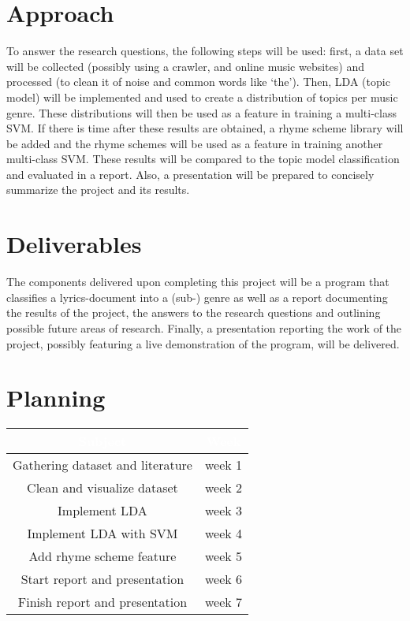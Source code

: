 \documentclass[12pt,a4paper]{amsart}
\begin{document}
\section{Approach}
To answer the research questions, the following steps will be used: first, a data set will be collected (possibly using a crawler, and online music websites) and processed (to clean it of noise and common words like `the'). Then, LDA (topic model) will be implemented and used to create a distribution of topics per music genre. These distributions will then be used as a feature in training a multi-class SVM. If there is time after these results are obtained, a rhyme scheme library will be added and the rhyme schemes will be used as a feature in training another multi-class SVM. These results will be compared to the topic model classification and evaluated in a report. Also, a presentation will be prepared to concisely summarize the project and its results.

\section{Deliverables}
The components delivered upon completing this project will be a program that classifies a lyrics-document into a (sub-) genre as well as a report documenting the results of the project, the answers to the research questions and outlining possible future areas of research. Finally, a  presentation reporting the work of the project, possibly featuring a live demonstration of the program, will be delivered.
\section{Planning}

\begin{tabular}{ |c | c |}
\rowcolor{dark-gray}
\hline
\textcolor{white}{\textbf{Subject}} & \textcolor{white}{\textbf{Week}}\\
	\hline
	Gathering dataset and literature & week 1  \\
	\hline
	Clean and visualize dataset & week 2 \\
	\hline
	Implement LDA & week 3 \\
	\hline
	Implement LDA with SVM & week 4 \\
	\hline
	Add rhyme scheme feature & week 5 \\
	\hline
	Start report and presentation & week 6 \\
	\hline
	Finish report and presentation & week 7\\
	\hline
\end{tabular}\\



\end{document}
